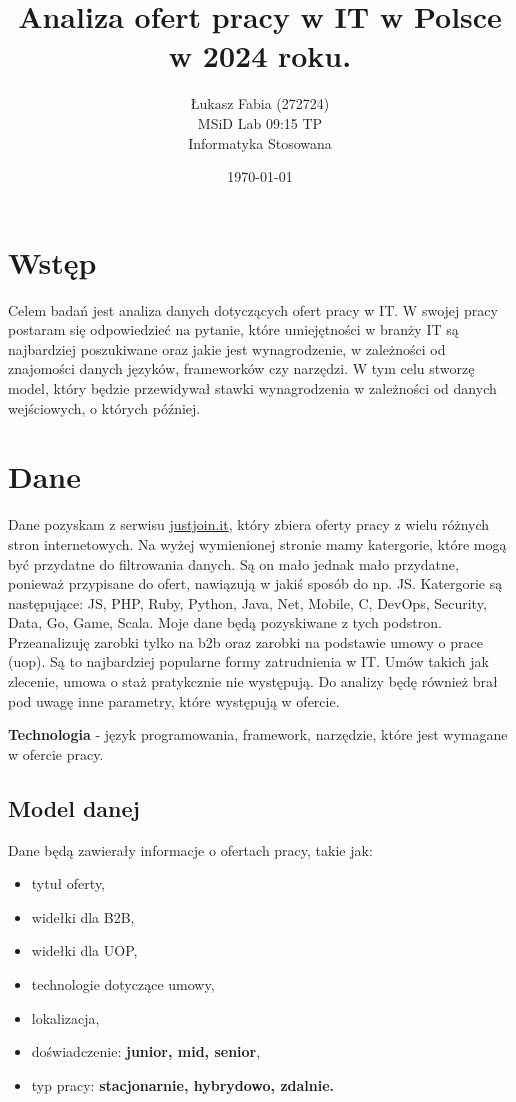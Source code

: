 \documentclass[a4paper]{article}
\title{Analiza ofert pracy w IT w Polsce w 2024 roku.}
\author{Łukasz Fabia (272724) \\ MSiD Lab 09:15 TP \\ Informatyka Stosowana}
\date{\today}
\begin{document}
\maketitle
\tableofcontents

\newpage

\section{Wstęp}

\quad Celem badań jest analiza danych dotyczących ofert pracy w IT. W swojej pracy postaram się
odpowiedzieć na pytanie, które umiejętności w branży IT są najbardziej poszukiwane oraz jakie jest wynagrodzenie,
w zależności od znajomości danych języków, frameworków czy narzędzi. W tym celu stworzę model, który będzie przewidywał stawki wynagrodzenia w zależności od danych wejściowych,
o których później.


\section{Dane}

\quad Dane pozyskam z serwisu \href{https://justjoin.it/}{justjoin.it}, który zbiera oferty pracy z wielu różnych stron internetowych. Na wyżej wymienionej stronie mamy katergorie, które mogą być przydatne do filtrowania danych. Są on mało jednak mało przydatne, ponieważ przypisane do ofert, nawiązują w jakiś sposób do np. JS. Katergorie są następujące:
JS, PHP, Ruby, Python, Java, Net, Mobile, C, DevOps, Security, Data, Go, Game, Scala. Moje dane będą pozyskiwane z tych podstron.\\
\quad Przeanalizuję zarobki tylko na b2b oraz zarobki na podstawie umowy o prace (uop). Są to najbardziej popularne formy zatrudnienia w IT. Umów takich jak zlecenie, umowa o staż pratykcznie nie występują. Do analizy będę również brał pod uwagę inne parametry, które występują w ofercie.

\textbf{\newline Technologia} - język programowania, framework, narzędzie, które jest wymagane w ofercie pracy.

\subsection{Model danej}
\quad Dane będą zawierały informacje o ofertach pracy, takie jak:
\begin{itemize}
    \item tytuł oferty,
    \item widełki dla B2B,
    \item widełki dla UOP,
    \item technologie dotyczące umowy,
    \item lokalizacja,
    \item doświadczenie: \textbf{junior, mid, senior},
    \item typ pracy: \textbf{stacjonarnie, hybrydowo, zdalnie.}
\end{itemize}
\end{document}

